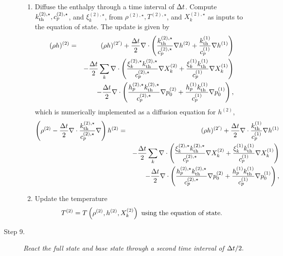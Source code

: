 \begin{description}
\begin{enumerate}
\item Diffuse the enthalpy through a time interval of $\Delta t$.  Compute $k_{\rm th}^{(2),\star}, c_p^{(2),\star}$, and $\xi_k^{(2),\star}$, from $\rho^{(2),\star}, T^{(2),\star}$, and $X_k^{(2),\star}$ as inputs to the equation of state.  The update is given by
\begin{eqnarray}
(\rho h)^{(2)} &=& (\rho h)^{(2')} + \frac{\Delta t}{2}\nabla\cdot\left(\frac{k_{\rm th}^{(2),\star}}{c_p^{(2),\star}}\nabla h^{(2)} + \frac{k_{\rm th}^{(1)}}{c_p^{(1)}}\nabla h^{(1)}\right)\nonumber\\
&&- \frac{\Delta t}{2}\sum_k\nabla\cdot\left(\frac{\xi_k^{(2),\star}k_{\rm th}^{(2),\star}}{c_p^{(2),\star}}\nabla X_k^{(2)} + \frac{\xi_k^{(1)}k_{\rm th}^{(1)}}{c_p^{(1)}}\nabla X_k^{(1)}\right)\nonumber\\
&&- \frac{\Delta t}{2}\nabla\cdot\left(\frac{h_p^{(2),\star}k_{\rm th}^{(2),\star}}{c_p^{(2),\star}}\nabla p_0^{(2)} + \frac{h_p^{(1)}k_{\rm th}^{(1)}}{c_p^{(1)}}\nabla p_0^{(1)}\right),
\end{eqnarray}
which is numerically implemented as a diffusion equation for $h^{(2)}$,
\begin{eqnarray}
\left(\rho^{(2)} - \frac{\Delta t}{2}\nabla\cdot\frac{k_{\rm th}^{(2),\star}}{c_p^{(2),\star}}\nabla\right)h^{(2)} &=& (\rho h)^{(2')} + \frac{\Delta t}{2}\nabla\cdot\frac{k_{\rm th}^{(1)}}{c_p^{(1)}}\nabla h^{(1)}\nonumber\\
&&- \frac{\Delta t}{2}\sum_k\nabla\cdot\left(\frac{\xi_k^{(2),\star}k_{\rm th}^{(2),\star}}{c_p^{(2),\star}}\nabla X_k^{(2)} + \frac{\xi_k^{(1)}k_{\rm th}^{(1)}}{c_p^{(1)}}\nabla X_k^{(1)}\right)\nonumber\\
&&- \frac{\Delta t}{2}\nabla\cdot\left(\frac{h_p^{(2),\star}k_{\rm th}^{(2),\star}}{c_p^{(2),\star}}\nabla p_0^{(2)} + \frac{h_p^{(1)}k_{\rm th}^{(1)}}{c_p^{(1)}}\nabla p_0^{(1)}\right),
\end{eqnarray}
\item Update the temperature
\begin{equation}
T^{(2)} = T\left(\rho^{(2)}, h^{(2)}, X_k^{(2)}\right) {\hbox{ \rm using the equation of state.}}
\end{equation}

\end{enumerate}

\item[Step 9.] {\em React the full state and base state through a second time 
interval of $\Delta t / 2.$}


\end{description}
